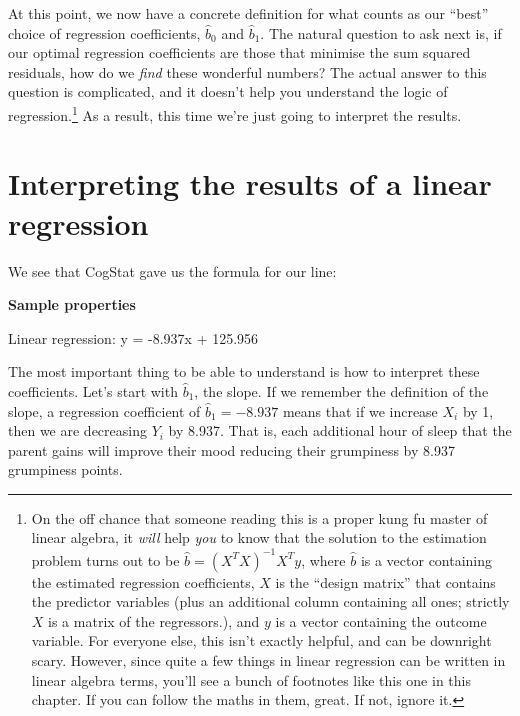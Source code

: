 \documentclass[
]{book}
\theoremstyle{definition}
\theoremstyle{definition}
\theoremstyle{definition}
\theoremstyle{definition}
\theoremstyle{remark}
\begin{document}
At this point, we now have a concrete definition for what counts as our ``best'' choice of regression coefficients, \(\hat{b}_0\) and \(\hat{b}_1\). The natural question to ask next is, if our optimal regression coefficients are those that minimise the sum squared residuals, how do we \emph{find} these wonderful numbers? The actual answer to this question is complicated, and it doesn't help you understand the logic of regression.\footnote{On the off chance that someone reading this is a proper kung fu master of linear algebra, it \emph{will} help \emph{you} to know that the solution to the estimation problem turns out to be \(\hat{b} = (X^TX)^{-1} X^T y\), where \(\hat{b}\) is a vector containing the estimated regression coefficients, \(X\) is the ``design matrix'' that contains the predictor variables (plus an additional column containing all ones; strictly \(X\) is a matrix of the regressors.), and \(y\) is a vector containing the outcome variable. For everyone else, this isn't exactly helpful, and can be downright scary. However, since quite a few things in linear regression can be written in linear algebra terms, you'll see a bunch of footnotes like this one in this chapter. If you can follow the maths in them, great. If not, ignore it.} As a result, this time we're just going to interpret the results.

\hypertarget{regressioninterpretation}{%
\section{Interpreting the results of a linear regression}\label{regressioninterpretation}}

We see that CogStat gave us the formula for our line:

\begin{tcolorbox}[colback=white,
  colframe=lightgray,
  coltext=black,
  boxsep=4pt,
  boxrule=0.3pt,
  arc=0pt]
  {   \sffamily
      \color{CSbluelight}\textbf{Sample properties}
      
      \color{black}
      Linear regression: y = -8.937x + 125.956

      \normalfont
  }
\end{tcolorbox}

The most important thing to be able to understand is how to interpret these coefficients. Let's start with \(\hat{b}_1\), the slope. If we remember the definition of the slope, a regression coefficient of \(\hat{b}_1 = -8.937\) means that if we increase \(X_i\) by 1, then we are decreasing \(Y_i\) by 8.937. That is, each additional hour of sleep that the parent gains will improve their mood reducing their grumpiness by 8.937 grumpiness points.
\end{document}
